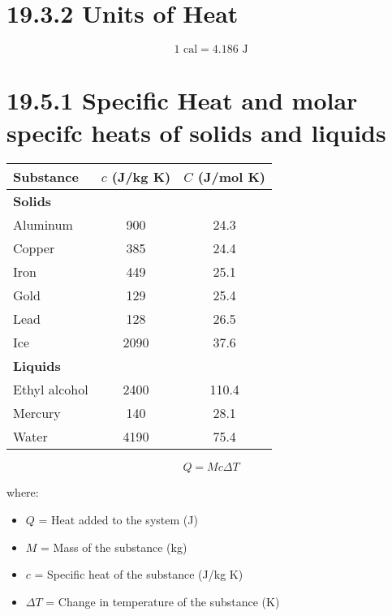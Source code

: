\documentclass{article}
\begin{document}
\section*{19.3.2 Units of Heat}

\begin{equation}
    1 \text{ cal} = 4.186 \text{ J}
\end{equation}


\vspace{2cm}




\begin{table}[h]
    \centering
    \section*{19.5.1 Specific Heat and molar specifc heats of solids and liquids}
    \begin{tabular}{lcc}
        \toprule
        \textbf{Substance} & \textbf{$c$ (J/kg K)} & \textbf{$C$ (J/mol K)} \\
        \midrule
        \multicolumn{3}{l}{\textbf{Solids}} \\
        Aluminum  & 900  & 24.3 \\
        Copper    & 385  & 24.4 \\
        Iron      & 449  & 25.1 \\
        Gold      & 129  & 25.4 \\
        Lead      & 128  & 26.5 \\
        Ice       & 2090 & 37.6 \\
        \midrule
        \multicolumn{3}{l}{\textbf{Liquids}} \\
        Ethyl alcohol & 2400 & 110.4 \\
        Mercury       & 140  & 28.1 \\
        Water         & 4190 & 75.4 \\
        \bottomrule
    \end{tabular}
\end{table}

\vspace{2cm}


\begin{equation}
    Q = Mc \Delta T
\end{equation}

where:
\begin{itemize}
    \item $Q$ = Heat added to the system (J)
    \item $M$ = Mass of the substance (kg)
    \item $c$ = Specific heat of the substance (J/kg K)
    \item $\Delta T$ = Change in temperature of the substance (K)
\end{itemize}
\end{document}
